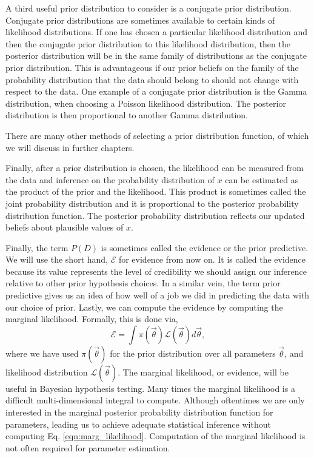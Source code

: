 A third useful prior distribution to consider is a conjugate prior distribution. Conjugate prior distributions are sometimes available to certain kinds of likelihood distributions. If one has chosen a particular likelihood distribution and then the conjugate prior distribution to this likelihood distribution, then the posterior distribution will be in the same family of distributions as the conjugate prior distribution. This is advantageous if our prior beliefs on the family of the probability distribution that the data should belong to should not change with respect to the data. One example of a conjugate prior distribution is the Gamma distribution, when choosing a Poisson likelihood distribution. The posterior distribution is then proportional to another Gamma distribution.

There are many other methods of selecting a prior distribution function, of which we will discuss in further chapters.

Finally, after a prior distribution is chosen, the likelihood can be measured from the data and inference on the probability distribution of $x$ can be estimated as the product of the prior and the likelihood. This product is sometimes called the joint probability distribution and it is proportional to the posterior probability distribution function. The posterior probability distribution reflects our updated beliefs about plausible values of $x$.

Finally, the term $P(D)$ is sometimes called the evidence or the prior predictive. We will use the short hand, $\mathcal{E}$ for evidence from now on. It is called the evidence because its value represents the level of credibility we should assign our inference relative to other prior hypothesis choices. In a similar vein, the term prior predictive gives us an idea of how well of a job we did in predicting the data with our choice of prior. Lastly, we can compute the evidence by computing the marginal likelihood. Formally, this is done via,
\begin{equation}\label{eqn:marg_likelihood}
    \mathcal{E} = \int \pi(\vec{\theta}) \mathcal{L}(\vec{\theta}) d\vec{\theta},
\end{equation}
where we have used $\pi(\vec{\theta})$ for the prior distribution over all parameters $\vec{\theta}$, and likelihood distribution $\mathcal{L}(\vec{\theta})$. The marginal likelihood, or evidence, will be useful in Bayesian hypothesis testing. Many times the marginal likelihood is a difficult multi-dimensional integral to compute. Although oftentimes we are only interested in the marginal posterior probability distribution function for parameters, leading us to achieve adequate statistical inference without computing Eq. \ref{eqn:marg_likelihood}. Computation of the marginal likelihood is not often required for parameter estimation.


